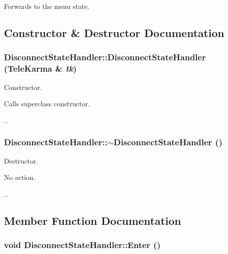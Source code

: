 Forwards to the menu state. 

\subsection{Constructor \& Destructor Documentation}
\hypertarget{classDisconnectStateHandler_b709ff60114f2c969990472c0ff4c7fd}{
\subsubsection[{DisconnectStateHandler}]{\setlength{\rightskip}{0pt plus 5cm}DisconnectStateHandler::DisconnectStateHandler ({\bf TeleKarma} \& {\em tk})}}
\label{classDisconnectStateHandler_b709ff60114f2c969990472c0ff4c7fd}


Constructor. 

Calls superclass constructor.

.. \hypertarget{classDisconnectStateHandler_a0192a1bd52d0d9b8838e121af27bba5}{
\subsubsection[{$\sim$DisconnectStateHandler}]{\setlength{\rightskip}{0pt plus 5cm}DisconnectStateHandler::$\sim$DisconnectStateHandler ()}}
\label{classDisconnectStateHandler_a0192a1bd52d0d9b8838e121af27bba5}


Destructor. 

No action.

.. 

\subsection{Member Function Documentation}
\hypertarget{classDisconnectStateHandler_29fb86c820ff7ff183051170161347eb}{
\subsubsection[{Enter}]{\setlength{\rightskip}{0pt plus 5cm}void DisconnectStateHandler::Enter ()}}
\label{classDisconnectStateHandler_29fb86c820ff7ff183051170161347eb}


